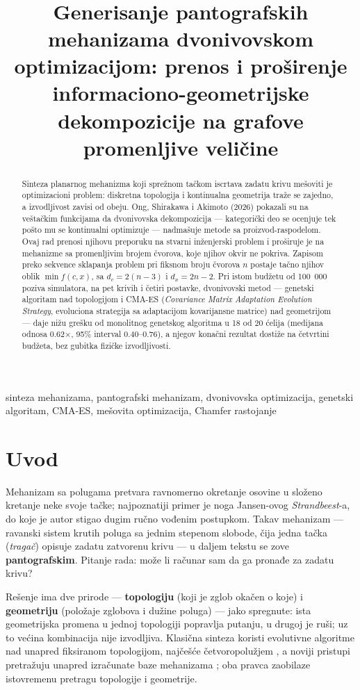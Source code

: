 \documentclass[
  conference,
  a4paper,
  10pt]{IEEEtran}
\title{\makebox[\textwidth][l]{\normalfont\normalsize IEEESTEC -- Student Projects Conference, Ni\v{s}, 2026.}\\[-2pt]\makebox[\textwidth][l]{\normalfont\footnotesize https://doi.org/ (organizator dodaje broj)}\\[-2pt]\makebox[\textwidth][l]{\normalfont\footnotesize Original scientific paper}\\[6pt] Generisanje pantografskih mehanizama dvonivovskom optimizacijom:
prenos i proširenje informaciono-geometrijske dekompozicije na grafove
promenljive veličine}
\author{\IEEEauthorblockN{Nikola Najić}\IEEEauthorblockA{Istraživačka stanica Petnica\\ Valjevo, Srbija\\ nnajic1@gmail.com, ORCID: N/A}
\and
\IEEEauthorblockN{Branislav Milojković}\IEEEauthorblockA{Istraživačka stanica Petnica\\ Valjevo, Srbija\\ branislav.milojkovic@petnica.rs}}
\date{}
\begin{document}
\maketitle
\begin{abstract}
Sinteza planarnog mehanizma koji sprežnom tačkom iscrtava zadatu krivu
mešoviti je optimizacioni problem: diskretna topologija i kontinualna
geometrija traže se zajedno, a izvodljivost zavisi od obeju. Ong,
Shirakawa i Akimoto (2026) pokazali su na veštačkim funkcijama da
dvonivovska dekompozicija --- kategorički deo se ocenjuje tek pošto mu
se kontinualni optimizuje --- nadmašuje metode sa proizvod-raspodelom.
Ovaj rad prenosi njihovu preporuku na stvarni inženjerski problem i
proširuje je na mehanizme sa promenljivim brojem čvorova, koje njihov
okvir ne pokriva. Zapisom preko sekvence sklapanja problem pri fiksnom
broju čvorova \(n\) postaje tačno njihov oblik \(\min f(c,x)\), sa
\(d_c = 2(n-3)\) i \(d_x = 2n-2\). Pri istom budžetu od 100~000 poziva
simulatora, na pet krivih i četiri postavke, dvonivovski metod ---
genetski algoritam nad topologijom i CMA-ES (\emph{Covariance Matrix
Adaptation Evolution Strategy}, evoluciona strategija sa adaptacijom
kovarijansne matrice) nad geometrijom --- daje nižu grešku od monolitnog
genetskog algoritma u 18 od 20 ćelija (medijana odnosa 0.62×, 95\%
interval 0.40--0.76), a njegov konačni rezultat dostiže na četvrtini
budžeta, bez gubitka fizičke izvodljivosti.
\end{abstract}
\begin{IEEEkeywords}
sinteza mehanizama, pantografski mehanizam, dvonivovska optimizacija, genetski algoritam, CMA-ES, mešovita optimizacija, Chamfer rastojanje
\end{IEEEkeywords}

\hypertarget{uvod}{%
\section{Uvod}\label{uvod}}

Mehanizam sa polugama pretvara ravnomerno okretanje osovine u složeno
kretanje neke svoje tačke; najpoznatiji primer je noga Jansen-ovog
\emph{Strandbeest}-a, do koje je autor stigao dugim ručno vođenim
postupkom. Takav mehanizam --- ravanski sistem krutih poluga sa jednim
stepenom slobode, čija jedna tačka (\emph{tragač}) opisuje zadatu
zatvorenu krivu --- u daljem tekstu se zove \textbf{pantografskim}.
Pitanje rada: može li računar sam da ga pronađe za zadatu krivu?

Rešenje ima dve prirode --- \textbf{topologiju} (koji je zglob okačen o
koje) i \textbf{geometriju} (položaje zglobova i dužine poluga) --- jako
spregnute: ista geometrijska promena u jednoj topologiji popravlja
putanju, u drugoj je ruši; uz to većina kombinacija nije izvodljiva.
Klasična sinteza koristi evolutivne algoritme nad unapred fiksiranom
topologijom, najčešće četvoropolužjem \citep{cabrera, sleesongsom}, a
noviji pristupi pretražuju unapred izračunate baze mehanizama
\citep{link, tang}; oba pravca zaobilaze istovremenu pretragu topologije
i geometrije.
\end{document}
